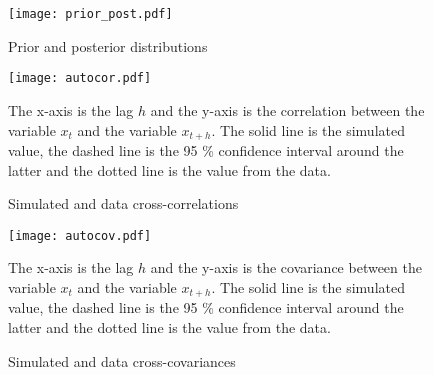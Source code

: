 \begin{figure}[H]
\begin{center}
\texttt{[image: prior\_post.pdf]}
\caption{Prior and posterior distributions}
\end{center}
\end{figure}

\begin{landscape}
\begin{figure}[H]
\begin{center}
\texttt{[image: autocor.pdf]}
\caption{Simulated and data cross-correlations}
\end{center}
\begin{flushleft}
\footnotesize The x-axis is the lag $h$ and the y-axis is the correlation between the variable $x_t$ and the variable $x_{t+h}$. The solid line is the simulated value, the dashed line is the 95 \% confidence interval around the latter and the dotted line is the value from the data.
\end{flushleft}
\end{figure}

\begin{figure}[H]
\begin{center}
\texttt{[image: autocov.pdf]}
\caption{Simulated and data cross-covariances}
\end{center}
\begin{flushleft}
\footnotesize The x-axis is the lag $h$ and the y-axis is the covariance between the variable $x_t$ and the variable $x_{t+h}$. The solid line is the simulated value, the dashed line is the 95 \% confidence interval around the latter and the dotted line is the value from the data.
\end{flushleft}
\end{figure}
\end{landscape}